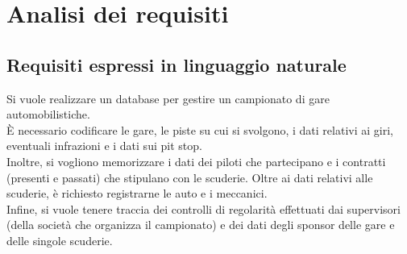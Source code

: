 \documentclass[11pt]{article}
\begin{document}
\tableofcontents
\newpage


\section{Analisi dei requisiti}
\subsection{Requisiti espressi in linguaggio naturale}
Si vuole realizzare un database per gestire un campionato di gare automobilistiche. \\
È necessario codificare le gare, le piste su cui si svolgono, i dati relativi ai giri, eventuali infrazioni e i dati sui pit stop. \\
Inoltre, si vogliono memorizzare i dati dei piloti che partecipano e i contratti (presenti e passati) che stipulano con le scuderie. Oltre ai dati relativi alle scuderie, è richiesto registrarne le auto e i meccanici. \\
Infine, si vuole tenere traccia dei controlli di regolarità effettuati dai supervisori (della società che organizza il campionato) e dei dati degli sponsor delle gare e delle singole scuderie. \\[1em]
\end{document}
